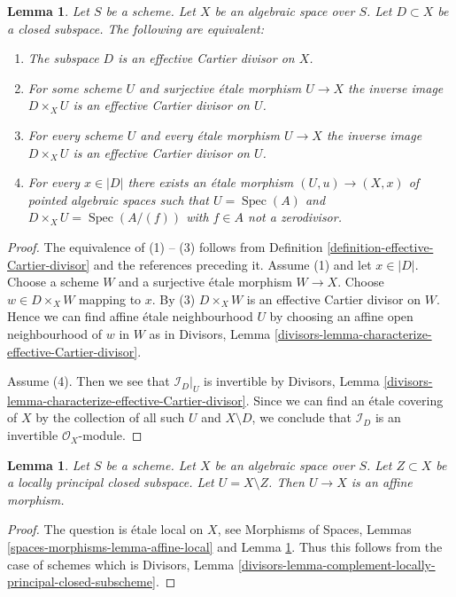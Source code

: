 \documentclass{stacks-project}
\theoremstyle{plain}
\newtheorem{lemma}[subsection]{Lemma}
\theoremstyle{definition}
\theoremstyle{remark}
\numberwithin{equation}{subsection}
\def\Spec{\mathop{\mathrm{Spec}}}
\begin{document}
\begin{lemma}
\label{lemma-characterize-effective-Cartier-divisor}
Let $S$ be a scheme. Let $X$ be an algebraic space over $S$.
Let $D \subset X$ be a closed subspace.
The following are equivalent:
\begin{enumerate}
\item The subspace $D$ is an effective Cartier divisor on $X$.
\item For some scheme $U$ and surjective \'etale morphism $U \to X$
the inverse image $D \times_X U$ is an effective Cartier divisor on $U$.
\item For every scheme $U$ and every \'etale morphism $U \to X$
the inverse image $D \times_X U$ is an effective Cartier divisor on $U$.
\item For every $x \in |D|$ there exists an \'etale morphism
$(U, u) \to (X, x)$ of pointed algebraic spaces such that $U = \Spec(A)$
and $D \times_X U = \Spec(A/(f))$ with $f \in A$ not a zerodivisor.
\end{enumerate}
\end{lemma}

\begin{proof}
The equivalence of (1) -- (3) follows from
Definition \ref{definition-effective-Cartier-divisor}
and the references preceding it.
Assume (1) and let $x \in |D|$. Choose a scheme $W$ and a
surjective \'etale morphism
$W \to X$. Choose $w \in D \times_X W$ mapping to $x$.
By (3) $D \times_X W$ is an effective Cartier
divisor on $W$. Hence we can find affine \'etale neighbourhood $U$
by choosing an affine open neighbourhood of $w$ in $W$ as in
Divisors, Lemma \ref{divisors-lemma-characterize-effective-Cartier-divisor}.

\medskip\noindent
Assume (4). Then we see that $\mathcal{I}_D|_U$ is invertible by
Divisors, Lemma \ref{divisors-lemma-characterize-effective-Cartier-divisor}.
Since we can find an \'etale covering of $X$ by the collection of
all such $U$ and $X \setminus D$, we conclude that
$\mathcal{I}_D$ is an invertible $\mathcal{O}_X$-module.
\end{proof}

\begin{lemma}
\label{lemma-complement-locally-principal-closed-subscheme}
Let $S$ be a scheme. Let $X$ be an algebraic space over $S$.
Let $Z \subset X$ be a locally principal closed
subspace. Let $U = X \setminus Z$. Then $U \to X$ is an affine morphism.
\end{lemma}

\begin{proof}
The question is \'etale local on $X$, see
Morphisms of Spaces, Lemmas \ref{spaces-morphisms-lemma-affine-local}
and
Lemma \ref{lemma-characterize-effective-Cartier-divisor}.
Thus this follows from the case of schemes which is
Divisors, Lemma
\ref{divisors-lemma-complement-locally-principal-closed-subscheme}.
\end{proof}
\end{document}
